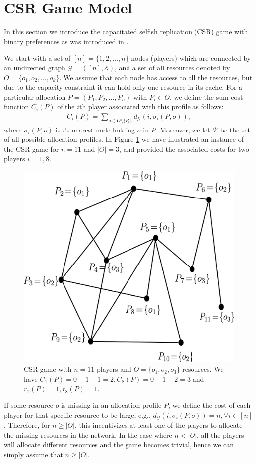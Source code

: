 \section{CSR Game Model}\label{sec:game-model}

In this section we introduce the capacitated selfish replication (CSR) game with binary preferences as was introduced in \cite{gopalakrishnan2012cache}. 

We start with a set of $[n]=\{1,2,\ldots,n\}$ nodes (players) which are connected by an undirected graph $\mathcal{G}=([n], \mathcal{E})$, and a set of all resources denoted by $O=\{o_1, o_2,\ldots, o_k\}$. We assume that each node has access to all the resources, but due to the capacity constraint it can hold only one resource in its cache. For a particular allocation $P=(P_1, P_2, \ldots, P_n)$ with $P_i\in O$, we define the sum cost function $C_i(P)$ of the $i$th player associated with this  profile as follows:
\begin{align}\label{eq:CSR-cost-formulation}
C_i(P)=\sum_{o\in O\setminus \{P_i\}}d_{\mathcal{G}}(i, \sigma_i(P,o)), 
\end{align}
where $\sigma_i(P,o)$ is $i$'s nearest node holding $o$ in $P$. Moreover, we let $\mathcal{P}$ be the set of all possible allocation profiles. In Figure \ref{fig:example-model} we have illustrated an instance of the CSR game for $n=11$ and $|O|=3$, and provided the associated costs for two players $i=1,8$.

\begin{figure}[htb]
\vspace{-1.5cm}
\begin{center}
\includegraphics[totalheight=.22\textheight,
width=.4\textwidth,viewport=-50 0 800 750]{example} \hspace{0.4in}
\end{center}
\vspace{-0.3cm}\caption{CSR game with $n=11$ players and $O=\{o_1,o_2,o_3\}$ resources. We have $C_1(P)=0+1+1=2, C_8(P)=0+1+2=3$ and $r_1(P)=1, r_8(P)=1$.}
\label{fig:example-model}
\end{figure}
\vspace{-0.3cm}
\begin{remark}
If some resource $o$ is missing in an allocation profile $P$, we define the cost of each player for that specific resource to be large, e.g., $d_{\mathcal{G}}(i, \sigma_i(P, o)) = n, \forall i \in [n]$. Therefore, for $n \ge |O|$, this incentivizes at least one of the players to allocate the missing resources in the network. In the case where $n < |O|$, all the players will allocate different resources and the game becomes trivial, hence we can simply assume that $n \ge |O|$. 
\end{remark}

